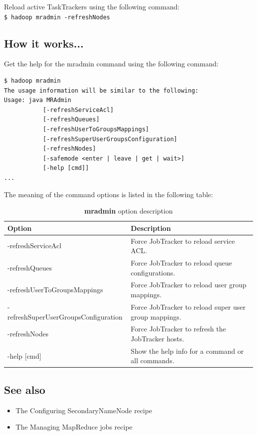 Reload active TaskTrackers using the following command:\\
\verb|$ hadoop mradmin -refreshNodes|

\subsection*{How it works...}
Get the help for the mradmin command using the following command:
\lstset{style=bashstyle}
\begin{lstlisting}
$ hadoop mradmin
The usage information will be similar to the following:
Usage: java MRAdmin
           [-refreshServiceAcl]
           [-refreshQueues]
           [-refreshUserToGroupsMappings]
           [-refreshSuperUserGroupsConfiguration]
           [-refreshNodes]
           [-safemode <enter | leave | get | wait>]
           [-help [cmd]]
...
\end{lstlisting}

The meaning of the command options is listed in the following table:
\begin{table}
  \centering
  \small
  \begin{tabular}{ll}
    \toprule 
    \textbf{Option} & \textbf{Description} \\  \midrule
    -refreshServiceAcl & Force JobTracker to reload service ACL. \\
    -refreshQueues & Force JobTracker to reload queue configurations. \\
    -refreshUserToGroupsMappings & Force JobTracker to reload user group mappings. \\
    -refreshSuperUserGroupsConfiguration & Force JobTracker to reload super user group mappings. \\
    -refreshNodes & Force JobTracker to refresh the JobTracker hosts. \\
    -help [cmd] & Show the help info for a command or all commands. \\ \bottomrule
  \end{tabular} 
  \caption{\textbf{mradmin} option description}\label{tbl:mradmin}
\end{table}

\subsection*{See also}
\begin{itemize}
\item The Configuring SecondaryNameNode recipe
\item The Managing MapReduce jobs recipe
\end{itemize} 


